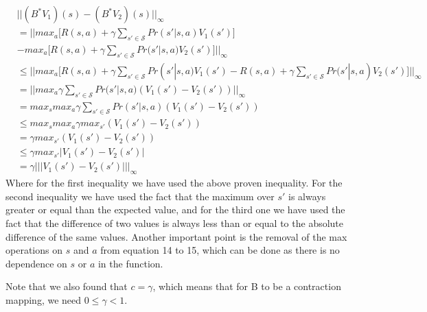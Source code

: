 \documentclass{exam}
\begin{document}
\begin{problem}
\begin{enumerate}
\begin{enumerate}[(a)]
\begin{solutionorlines}[2in]
            \begin{align}
                &|| (B^{*}V_1)(s) - (B^{*}V_2)(s) ||_{\infty} \\ 
                &= || max_a \big[ R(s, a) + \gamma \sum_{s' \in \mathcal{S}} Pr(s' | s, a) V_1(s') \big] \\
                        &- max_a \big[ R(s, a) + \gamma \sum_{s' \in \mathcal{S}} Pr(s' | s, a) V_2(s') \big] ||_{\infty}\\
                & \leq  || max_a \big[ R(s, a) + \gamma \sum_{s' \in \mathcal{S}} Pr(s' | s, a) V_1(s') - R(s, a) + \gamma \sum_{s' \in \mathcal{S}} Pr(s' | s, a) V_2(s') \big] ||_{\infty} \\
                & = || max_a \gamma \sum_{s' \in \mathcal{S}} Pr(s' | s, a) (V_1(s')-  V_2(s') )  ||_{\infty} \\
                &=  max_s  max_a \gamma \sum_{s' \in \mathcal{S}} Pr(s' | s, a) (V_1(s')-  V_2(s') ) \\
                & \leq  max_s  max_a \gamma max_{s'}  ( V_1(s') -  V_2(s') ) \\
                & = \gamma max_{s'}  (V_1(s') -  V_2(s') ) \\
                & \leq \gamma max_{s'}  |V_1(s') -  V_2(s') |\\
                & = \gamma ||  | V_1(s') -  V_2(s') | ||_{\infty}
            \end{align}
            Where for the first inequality we have used the above proven inequality. For the second inequality we have used the fact that the maximum over $s'$ is always greater or equal than the expected value, and for the third one we have used the fact that the difference of two values is always less than or equal to the absolute difference of the same values.
            Another important point is the removal of the max operations on $s$ and $a$ from equation 14 to 15, which can be done as there is no dependence on $s$ or $a$ in the function.
            
            Note that we also found that $c = \gamma$, which means that for B to be a contraction mapping, we need  $0 \le \gamma < 1$.
             \end{solutionorlines}

    \end{enumerate}
    
\end{enumerate}

\end{problem}




\end{document}
